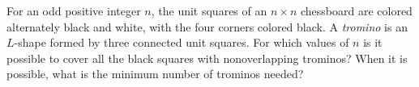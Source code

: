 For an odd positive integer $n$, the unit squares of an $n \times n$ chessboard are colored alternately black and white, with the four corners colored black. A \emph{tromino} is an $L$-shape formed by three connected unit squares. For which values of $n$ is it possible to cover all the black squares with nonoverlapping trominos? When it is possible, what is the minimum number of trominos needed?
